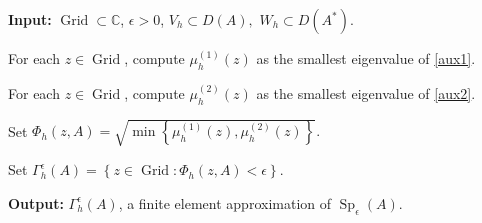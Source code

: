 \begin{algorithm}[ht]
\caption{Finite Element Formulation of .}
\label{pseudospec}

\textbf{Input:} $\operatorname{Grid}\subset\mathbb{C}$, $\epsilon>0$, $V_h\subset D(A),$
$W_h\subset D(A^*)$.

\begin{algorithmic}[1]
    \State For each $z\in\operatorname{Grid}$, compute
    $\mu_h^{(1)}(z)$ as the smallest eigenvalue of \eqref{aux1}.
    
    \State For each $z\in\operatorname{Grid}$, compute
    $\mu_h^{(2)}(z)$ as the smallest eigenvalue of \eqref{aux2}.
    
    \State Set $\Phi_h(z,A)=
        \sqrt{
            \min\left\{
                \mu_h^{(1)}(z),
                \mu_h^{(2)}(z)
            \right\}
        }.$
    
    \State Set
        $\Gamma_h^\epsilon(A)
        =
        \left\{
            z\in\operatorname{Grid}:
            \Phi_h(z,A)<\epsilon
        \right\}.$
\end{algorithmic}

\textbf{Output:} $\Gamma_h^\epsilon(A)$, a finite element approximation of
$\operatorname{Sp}_\epsilon(A)$.

\end{algorithm}